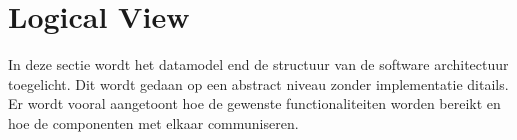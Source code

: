 \section{Logical View}
In deze sectie wordt het datamodel end de structuur van de software architectuur toegelicht.
Dit wordt gedaan op een abstract niveau zonder implementatie ditails.
Er wordt vooral aangetoont hoe de gewenste functionaliteiten worden bereikt en hoe de componenten met elkaar communiseren.



